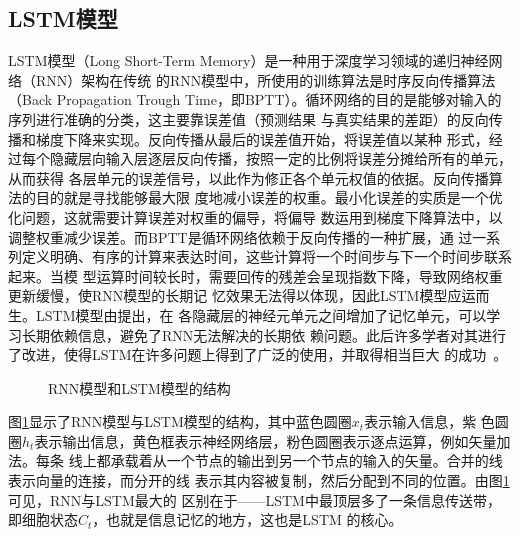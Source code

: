 \documentclass[lang=cn,12pt,a4paper,cite=authoryear]{elegantpaper}
\begin{document}
\subsection{LSTM模型}
LSTM模型（Long Short-Term Memory）是一种用于深度学习领域的递归神经网络（RNN）架构在传统
的RNN模型中，所使用的训练算法是时序反向传播算法（Back Propagation Trough 
Time，即BPTT）。循环网络的目的是能够对输入的序列进行准确的分类，这主要靠误差值（预测结果
与真实结果的差距）的反向传播和梯度下降来实现。反向传播从最后的误差值开始，将误差值以某种
形式，经过每个隐藏层向输入层逐层反向传播，按照一定的比例将误差分摊给所有的单元，从而获得
各层单元的误差信号，以此作为修正各个单元权值的依据。反向传播算法的目的就是寻找能够最大限
度地减小误差的权重。最小化误差的实质是一个优化问题，这就需要计算误差对权重的偏导，将偏导
数运用到梯度下降算法中，以调整权重减少误差。而BPTT是循环网络依赖于反向传播的一种扩展，通
过一系列定义明确、有序的计算来表达时间，这些计算将一个时间步与下一个时间步联系起来。当模
型运算时间较长时，需要回传的残差会呈现指数下降，导致网络权重更新缓慢，使RNN模型的长期记
忆效果无法得以体现，因此LSTM模型应运而生。LSTM模型由\cite{hochreiter1997lstm}提出，在
各隐藏层的神经元单元之间增加了记忆单元，可以学习长期依赖信息，避免了RNN无法解决的长期依
赖问题。此后许多学者对其进行了改进，使得LSTM在许多问题上得到了广泛的使用，并取得相当巨大
的成功~\citep{gers2000learning, graves2005bidirectional, graves2005framewise, 
schmidhuber2007training, bayer2009evolving, schaul2010pybrain, 
graves2013hybrid, bayer2014Learning}。

\begin{figure}[htp]
	\centering
    \caption{RNN模型和LSTM模型的结构}
	\label{fig:structure}
\end{figure}

图\ref{fig:structure}显示了RNN模型与LSTM模型的结构，其中蓝色圆圈$x_t$表示输入信息，紫
色圆圈$h_t$表示输出信息，黄色框表示神经网络层，粉色圆圈表示逐点运算，例如矢量加法。每条
线上都承载着从一个节点的输出到另一个节点的输入的矢量。合并的线表示向量的连接，而分开的线
表示其内容被复制，然后分配到不同的位置。由图\ref{fig:structure}可见，RNN与LSTM最大的
区别在于——LSTM中最顶层多了一条信息传送带，即细胞状态$C_t$，也就是信息记忆的地方，这也是LSTM
的核心。
\end{document}
